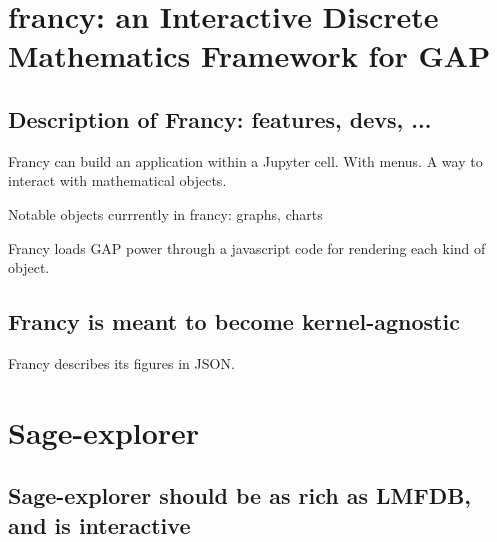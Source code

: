 \documentclass{deliverablereport}
\begin{document}
\section{francy: an Interactive Discrete Mathematics Framework for GAP}

\subsection{Description of Francy: features, devs, ...}

Francy can build an application within a Jupyter cell. With menus. A
way to interact with mathematical objects.

Notable objects currrently in francy: graphs, charts

Francy loads GAP power through a javascript code for rendering each
kind of object.

\subsection{Francy is meant to become kernel-agnostic}

Francy describes its figures in JSON.


\section{Sage-explorer}
\label{sage-explorer}

\subsection{Sage-explorer should be as rich as LMFDB, and is interactive}







\appendix

\end{document}
